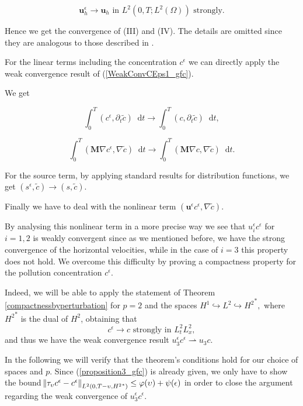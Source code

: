 \documentclass[12pt]{report}
\numberwithin{theorem}{chapter}
\numberwithin{corollary}{chapter}
\numberwithin{lemma}{chapter}
\numberwithin{remark}{chapter}
\numberwithin{definition}{chapter}
\numberwithin{prop}{chapter}
\newcommand*\diff{\mathop{}\!\mathrm{d}}
\begin{document}
\begin{equation} \label{R-F-K_applied}
  \mathbf{u}_h^\epsilon \to \mathbf{u}_h \text{ in } L^2(0, T; L^2 (\Omega)) \text{ strongly.}
\end{equation}

Hence we get the convergence of (III) and (IV). The details are omitted since they are analogous to those described in \cite{azerad2001mathematical}.
  
For the linear terms including the concentration $c^\epsilon$ we can directly apply the weak convergence result of (\ref{WeakConvCEps1_gfc}).
    
We get
    
$$ \int_0^T (c^\epsilon , \partial_t \tilde{c}) \diff t \to \int_0^T (c, \partial_t \tilde{c}) \diff t, $$
    
$$ \int_0^T (\mathbf{M} \nabla c^\epsilon, \nabla \tilde{c}) \diff t \to \int_0^T (\mathbf{M} \nabla c, \nabla \tilde{c}) \diff t. $$
      
For the source term, by applying standard results for distribution functions, we get $(s^\epsilon, \tilde{c}) \to (s, \tilde{c}).$ 
      
Finally we have to deal with the nonlinear term $(\mathbf{u}^\epsilon c^\epsilon, \nabla \tilde{c}).$
  
By analysing this nonlinear term in a more precise way we see that $u^\epsilon_i c^\epsilon$ for $i=1,2$ is weakly convergent since as we mentioned before, we have the strong convergence of the horizontal velocities, while in the case of $i=3$ this property does not hold. We overcome this difficulty by proving a compactness property for the pollution concentration $c^\epsilon.$

Indeed, we will be able to apply the statement of Theorem \ref{compactnessbyperturbation} for $p=2$ and the spaces $H^1 \hookrightarrow L^2 \hookrightarrow {H^2}^*,$ where ${H^2}^*$ is the dual of ${H^2}$, obtaining that
%
\[c^\epsilon \to c \text{ strongly in } L^2_t L^2_x,\]
%
and thus we have the weak convergence result $u^\epsilon_3 c^\epsilon \rightharpoonup u_3 c.$

In the following we will verify that the theorem's conditions hold for our choice of spaces and $p$. Since (\ref{proposition3_gfc}) is already given, we only have to show the bound $\norm{\tau_\upsilon c^\epsilon - c^\epsilon}_{L^2(0,T-\upsilon, {H^2}^*)} \leq \varphi(\upsilon) + \psi(\epsilon)$ in order to close the argument regarding the weak convergence of $u^\epsilon_3 c^\epsilon$.
\end{document}
